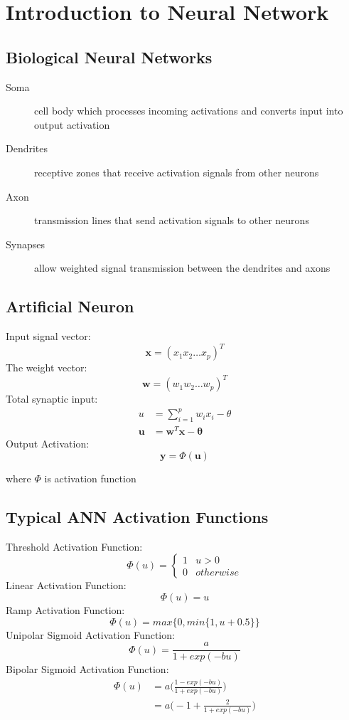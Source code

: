 \chapter{Introduction to Neural Network}

\section{Biological Neural Networks}

\begin{description}
\item[Soma] cell body which processes incoming activations and converts input into output activation
\item[Dendrites] receptive zones that receive activation signals from other neurons
\item[Axon] transmission lines that send activation signals to other neurons
\item[Synapses] allow weighted signal transmission between the dendrites and axons
\end{description}

\section{Artificial Neuron}
Input signal vector:
$$\mathbf{x}=(x_1x_2\ldots x_p)^{T}$$
The weight vector:
$$\mathbf{w}=(w_1w_2\ldots w_p)^{T}$$
Total synaptic input:
\begin{equation*}
\begin{split}
u &= \sum_{i=1}^{p} w_ix_i - \theta \\
\mathbf{u} &= \mathbf{w}^{T} \mathbf{x} - \pmb{\theta}
\end{split}
\end{equation*}
Output Activation:
$$\mathbf{y} = \Phi(\mathbf{u})$$
\begin{center}where $\Phi$ is activation function\end{center}

\section{Typical ANN Activation Functions}
Threshold Activation Function:
$$\Phi (u)=
\begin{cases} 
    1 & u>0 \\
    0 & otherwise
\end{cases}
$$
Linear Activation Function:
$$\Phi (u) = u$$
Ramp Activation Function:
$$\Phi (u) = max\{ 0, min\{ 1, u + 0.5 \} \}$$
Unipolar Sigmoid Activation Function:
$$\Phi (u) = \frac{a}{1+exp(-bu)}$$
Bipolar Sigmoid Activation Function:
\begin{equation*}
\begin{split}
\Phi (u) &= a\Bigg(\frac{1-exp(-bu)}{1+exp(-bu)}\Bigg) \\
&= a\Bigg(-1 + \frac{2}{1+exp(-bu)}\Bigg)
\end{split}
\end{equation*}

